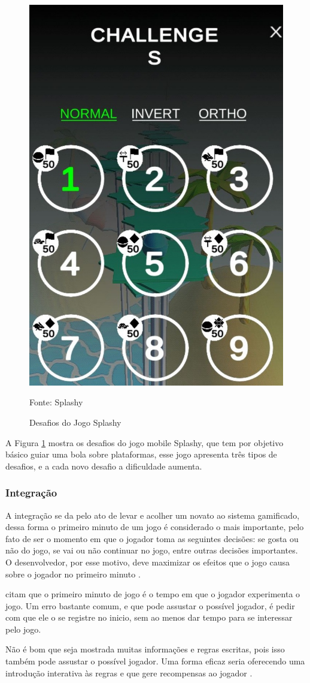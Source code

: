 		\begin{figure}[H]
			\centering
			\includegraphics[width=0.3\linewidth]{img/DesafiosSplashy}
			\caption{Desafios do Jogo Splashy}
			Fonte: Splashy
			\label{desafiosSplashy}
		\end{figure}	
				A Figura \ref{desafiosSplashy} mostra os desafios do jogo mobile Splashy, que tem por objetivo básico guiar uma bola sobre plataformas, esse jogo apresenta três tipos de desafios, e a cada novo desafio a dificuldade aumenta.
		\subsubsection{Integração}
		A integração se da pelo ato de levar e acolher um novato ao sistema gamificado, dessa forma o primeiro minuto de um jogo é considerado o mais importante, pelo fato de ser o momento em que o jogador toma as seguintes decisões: se gosta ou não do jogo, se vai ou não continuar no jogo, entre outras decisões importantes. O desenvolvedor, por esse motivo, deve maximizar os efeitos que o jogo causa sobre o jogador no primeiro minuto \cite{zichermann2011gamification}.
		
	 citam que o primeiro minuto de jogo é o tempo em que o jogador experimenta o jogo. Um erro bastante comum, e que pode assustar o possível jogador, é pedir com que ele o se registre no inicio, sem ao menos dar tempo para se interessar pelo jogo.
		
		Não é bom que seja mostrada muitas informações e regras escritas, pois isso também pode assustar o possível jogador. Uma forma eficaz seria oferecendo uma introdução interativa às regras e que gere recompensas ao jogador \cite{zichermann2011gamification}.
	
